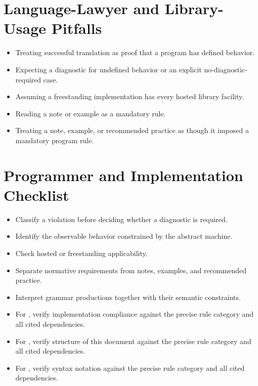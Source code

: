 \documentclass[11pt,letterpaper]{article}
\begin{document}
\section{Language-Lawyer and Library-Usage Pitfalls}
\begin{CornellReferencePitfallBox}\begin{itemize}[label=\textcolor{CornellReferenceAmber}{$\blacktriangleright$}]
\item Treating successful translation as proof that a program has defined behavior.
\item Expecting a diagnostic for undefined behavior or an explicit no-diagnostic-required case.
\item Assuming a freestanding implementation has every hosted library facility.
\item Reading a note or example as a mandatory rule.
\item Treating a note, example, or recommended practice as though it imposed a mandatory program rule.
\end{itemize}\end{CornellReferencePitfallBox}
\section{Programmer and Implementation Checklist}
\begin{CornellReferenceChecklistBox}\begin{itemize}[label=$\square$]
\item Classify a violation before deciding whether a diagnostic is required.
\item Identify the observable behavior constrained by the abstract machine.
\item Check hosted or freestanding applicability.
\item Separate normative requirements from notes, examples, and recommended practice.
\item Interpret grammar productions together with their semantic constraints.
\item For , verify implementation compliance against the precise rule category and all cited dependencies.
\item For , verify structure of this document against the precise rule category and all cited dependencies.
\item For , verify syntax notation against the precise rule category and all cited dependencies.
\end{itemize}\end{CornellReferenceChecklistBox}
\end{document}
